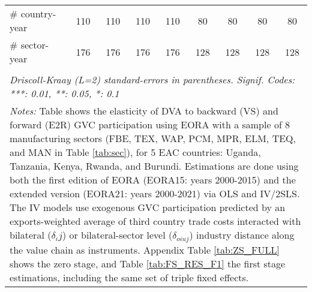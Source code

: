 \documentclass[a4paper]{article}
\begin{document}
\begin{table}[h!]
{\begin{tabular}{lcccccccc}
      \# country-year         & 110                & 110                   & 110                    & 110                   & 80                 & 80                    & 80                     & 80\\  
      \# sector-year          & 176                & 176                   & 176                    & 176                   & 128                & 128                   & 128                    & 128\\ 
      \bottomrule \\ [-0.9em]
      \multicolumn{9}{l}{\emph{Driscoll-Kraay (L=2) standard-errors in parentheses. Signif. Codes: ***: 0.01, **: 0.05, *: 0.1}}\\
      \multicolumn{9}{l}{\parbox{1.25\textwidth}{\scriptsize
\textit{Notes:} Table shows the elasticity of DVA to backward (VS) and forward (E2R) GVC participation using EORA with a sample of 8 manufacturing sectors (FBE, TEX, WAP, PCM, MPR, ELM, TEQ, and MAN in Table \ref{tab:sec}), for 5 EAC countries: Uganda, Tanzania, Kenya, Rwanda, and Burundi. Estimations are done using both the first edition of EORA (EORA15: years 2000-2015) and the extended version (EORA21: years 2000-2021) via OLS and IV/2SLS. The IV models use exogenous GVC participation predicted by an exports-weighted average of third country trade costs interacted with bilateral ($\delta_ij$) or bilateral-sector level ($\delta_{oiuj}$) industry distance along the value chain as instruments. Appendix Table \ref{tab:ZS_FULL} shows the zero stage, and Table \ref{tab:FS_RES_F1} the first stage estimations, including the same set of triple fixed effects. }}
   \end{tabular}
   }
\end{table}
\FloatBarrier
\end{document}
